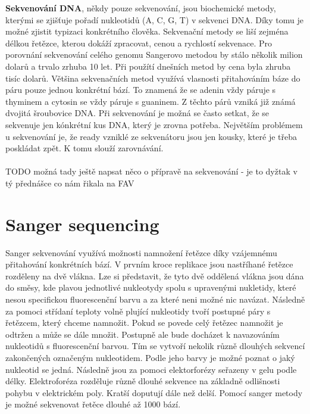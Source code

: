 \documentclass[czech,DP]{thesiskiv}
\numberwithin{equation}{section}
\begin{document}
\noindent
\textbf{Sekvenování DNA}, někdy pouze sekvenování, jsou biochemické metody, kterými se zjišťuje pořadí nukleotidů (A, C, G, T) v sekvenci DNA. Díky tomu je možné zjistit typizaci konkrétního člověka. Sekvenační metody se liší zejména délkou řetězce, kterou dokáží zpracovat, cenou a rychlostí sekvenace. Pro porovnání sekvenování celého genomu Sangerovo metodou by stálo několik milion dolarů a trvalo zrhuba 10 let. Při použítí dnešních metod by cena byla zhruba tisíc dolarů. Většina sekvenačních metod využívá vlasnosti přitahováním báze do páru pouze jednou konkrétní bází. To znamená že se adenin vždy páruje s thyminem a cytosin se vždy páruje s guaninem. Z těchto párů vzniká již známá dvojitá šroubovice DNA. Při sekvenování je možná se často setkat, že se sekvenuje jen kónkrétní kus DNA, který je zrovna potřeba. Největším problémem u sekvenování je, že ready vzniklé ze sekvenátoru jsou jen kousky, které je třeba poskládat zpět. K tomu slouží zarovnávání. \cite{sekvenovani_ziva}
\\
\\
TODO možná tady ještě napsat něco o přípravě na sekvenování - je to dyžtak v tý přednášce co nám řikala na FAV
\section{Sanger sequencing}
Sanger sekvenování využívá možnosti namnožení řetězce díky vzájemnému přitahování konkrétních bází. V prvním kroce replikace jsou nastříhané řetězce rozděleny na dvě vlákna. Lze si představit, že tyto dvě oddělená vlákna jsou dána do směsy, kde plavou jednotlivé nukleotydy spolu s upravenými nukletidy, které nesou specifickou fluorescenční barvu a za které neni možné nic navázat. Následně za pomoci střídaní teploty volně plující nukleotidy tvoří postupné páry s řetězcem, který chceme namnožit. Pokud se povede celý řetězec namnožit je odtržen a může se dále množit. Postupně ale bude docházet k navazováním nukleotidů s fluorescenční barvou. Tím se vytvoří nekolik různě dlouhých sekvencí zakončených označeným nukleotidem. Podle jeho barvy je možné poznat o jaký nukleotid se jedná. Následně jsou za pomoci elektorforézy seřazeny v gelu podle délky. Elektroforéza rozděluje různě dlouhé sekvence na základně odlišnosti pohybu v elektrickém poly. Kratší doputují dále než delší. Pomocí sanger metody je možné sekvenovat řetěce dlouhé až 1000 bází.   
\end{document}
